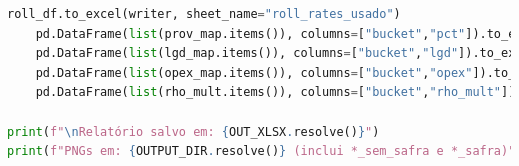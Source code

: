 \documentclass[11pt,a4paper]{article}
\newcommand{\1}{\mathbf{1}}
\begin{document}
\begin{lstlisting}[language=Python, caption={risk_frontier.py (versão completa com normalização por prazo e visões)}]
    roll_df.to_excel(writer, sheet_name="roll_rates_usado")
    pd.DataFrame(list(prov_map.items()), columns=["bucket","pct"]).to_excel(writer, sheet_name="prov_reg_usado", index=False)
    pd.DataFrame(list(lgd_map.items()), columns=["bucket","lgd"]).to_excel(writer, sheet_name="lgd_bucket_usado", index=False)
    pd.DataFrame(list(opex_map.items()), columns=["bucket","opex"]).to_excel(writer, sheet_name="opex_usado", index=False)
    pd.DataFrame(list(rho_mult.items()), columns=["bucket","rho_mult"]).to_excel(writer, sheet_name="rho_mult_usado", index=False)

print(f"\nRelatório salvo em: {OUT_XLSX.resolve()}")
print(f"PNGs em: {OUTPUT_DIR.resolve()} (inclui *_sem_safra e *_safra)")
\end{lstlisting}
\end{document}
